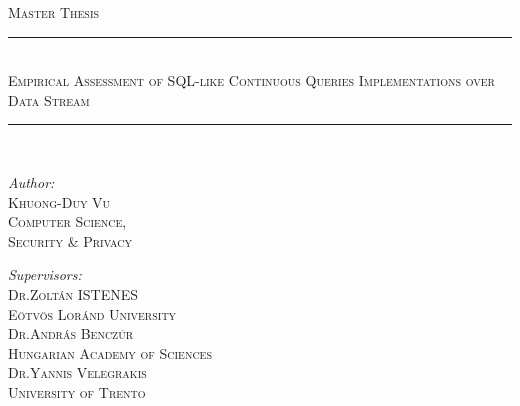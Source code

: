 \documentclass[a4paper,12pt,times,numbered,print,index]{Classes/PhDThesisPSnPDF}
\newcommand{\HRule}{\rule{\linewidth}{0.5mm}}
\begin{document}
\frontmatter




\begin{titlepage}
	\begin{center}
		\textsc{\Large Master Thesis}\\[0.3cm] %
		
		\HRule \\[0.4cm] %
	{\huge \vspace{0.5cm} \textsc{Empirical Assessment of SQL-like Continuous Queries Implementations 
over Data Stream   \\[0.4cm]}}
		\HRule \\[1.5cm] %
		
	\begin{minipage}{0.43\textwidth}
		\begin{flushleft} \large	
			\emph{Author:}\\
			\textsc{Khuong-Duy Vu\\ \small Computer Science, \\\hspace{0cm}Security \& Privacy  \\\hspace{0cm}} %
		\end{flushleft}
	\end{minipage}
	\begin{minipage}{0.56\textwidth}
		\begin{flushright} \large
			\emph{Supervisors:} \\
			\textsc{Dr.Zoltán ISTENES \\ \small Eötvös Loránd University\\[0.3cm] }
				\textsc{Dr.András Benczúr \\ \small Hungarian Academy of Sciences\\[0.3cm] }
				\textsc{Dr.Yannis Velegrakis \\ \small University of Trento\\[0.3cm] }
				
		\end{flushright}
	\end{minipage}\\[1cm]
	\begin{minipage}{0.37\textwidth}
		\begin{flushleft} \large	
			

\end{flushleft}
\end{minipage}
\end{center}
\end{titlepage}
\end{document}
